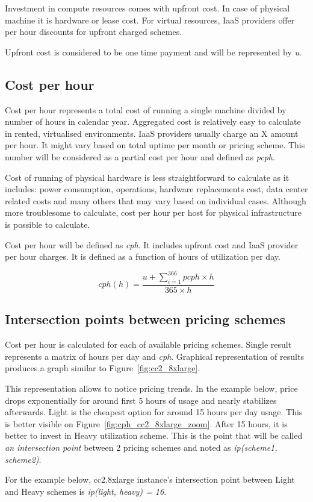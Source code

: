 \documentclass[]{final_report}
\begin{document}
Investment in compute resources comes with upfront cost. In case of physical machine it is hardware or lease cost. For virtual resources, IaaS providers offer per hour discounts for upfront charged schemes. \par
Upfront cost is considered to be one time payment and will be represented by \textit{u}. 

\subsection{Cost per hour}

Cost per hour represents a total cost of running a single machine divided by number of hours in calendar year. Aggregated cost is relatively easy to calculate in rented, virtualised environments. IaaS providers usually charge an X amount per hour. It might vary based on total uptime per month or pricing scheme. This number will be considered as a partial cost per hour and defined as \textit{pcph}. \par
Cost of running of physical hardware is less straightforward to calculate as it includes: power consumption, operations, hardware replacements cost, data center related costs and many others that may vary based on individual cases. Although more troublesome to calculate, cost per hour per host for physical infrastructure is possible to calculate. \par
Cost per hour will be defined as \textit{cph}. It includes upfront cost and IaaS provider per hour charges. It is defined as a function of hours of utilization per day.  

\begin{equation}
cph(h) = \frac{u + \sum_{i=1}^{366} pcph \times h}{365 \times h}
\end{equation}

\subsection{Intersection points between pricing schemes}

Cost per hour is calculated for each of available pricing schemes. Single result represents a matrix of hours per day and \textit{cph}. Graphical representation of results produces a graph similar to Figure~\ref{fig:cc2_8xlarge}. \par 
This representation allows to notice pricing trends. In the example below, price drops exponentially for around first 5 hours of usage and nearly stabilizes afterwards. Light is the cheapest option for around 15 hours per day usage. This is better visible on Figure~\ref{fig:cph_cc2_8xlarge_zoom}. After 15 hours, it is better to invest in Heavy utilization scheme. This is the point that will be called \textit{an intersection point} between 2 pricing schemes and noted as \textit{ip(scheme1, scheme2)}. \par
For the example below, cc2.8xlarge instance's intersection point between Light and Heavy schemes is \textit{ip(light, heavy) = 16}.
\end{document}
